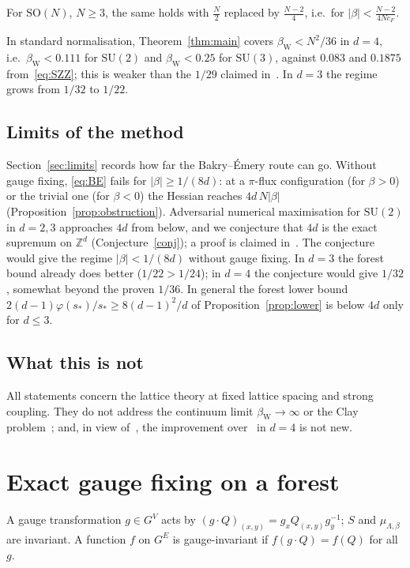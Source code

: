 \documentclass[11pt]{amsart}
\theoremstyle{definition}
\theoremstyle{remark}
\newcommand{\SU}{\mathrm{SU}}
\newcommand{\SO}{\mathrm{SO}}
\begin{document}
For $\SO(N)$, $N\ge3$, the same holds with $\frac{N}{2}$ replaced by $\frac{N-2}{4}$, i.e.\ for $|\beta|<\frac{N-2}{4Nc_F}$.

In standard normalisation, Theorem~\ref{thm:main} covers $\beta_{\mathrm W}<N^2/36$ in $d=4$, i.e.\
$\beta_{\mathrm W}<0.111$ for $\SU(2)$ and $\beta_{\mathrm W}<0.25$ for $\SU(3)$, against $0.083$ and $0.1875$
from~\eqref{eq:SZZ}; this is weaker than the $1/29$ claimed in~\cite{BBL}. In $d=3$ the regime grows from $1/32$
to $1/22$.

\subsection*{Limits of the method}
Section~\ref{sec:limits} records how far the Bakry--\'Emery route can go. Without gauge fixing, \eqref{eq:BE} fails
for $|\beta|\ge 1/(8d)$: at a $\pi$-flux configuration (for $\beta>0$) or the trivial one (for $\beta<0$) the Hessian
reaches $4d\,N|\beta|$ (Proposition~\ref{prop:obstruction}). Adversarial numerical maximisation for $\SU(2)$ in $d=2,3$ approaches $4d$ from below,
and we conjecture that $4d$ is the exact supremum on $\mathbb{Z}^d$ (Conjecture~\ref{conj}); a proof is claimed
in~\cite{BB-sharp}. The conjecture would give the regime $|\beta|<1/(8d)$ without gauge fixing. In $d=3$ the forest bound already does better ($1/22>1/24$); in $d=4$ the
conjecture would give $1/32$, somewhat beyond the proven $1/36$. In general the forest lower bound $2(d-1)\varphi(s_*)/s_*\ge 8(d-1)^2/d$ of Proposition~\ref{prop:lower} is
below $4d$ only for $d\le3$.

\subsection*{What this is not}
All statements concern the lattice theory at fixed lattice spacing and strong coupling. They do not address the
continuum limit $\beta_{\mathrm W}\to\infty$ or the Clay problem~\cite{JW}; and, in view of~\cite{BBL,BB-sharp}, the
improvement over~\cite{SZZ} in $d=4$ is not new.

\section{Exact gauge fixing on a forest}

A gauge transformation $g\in G^{V}$ acts by $(g\cdot Q)_{(x,y)}=g_xQ_{(x,y)}g_y^{-1}$; $S$ and $\mu_{\Lambda,\beta}$ are
invariant. A function $f$ on $G^E$ is gauge-invariant if $f(g\cdot Q)=f(Q)$ for all $g$.
\end{document}
